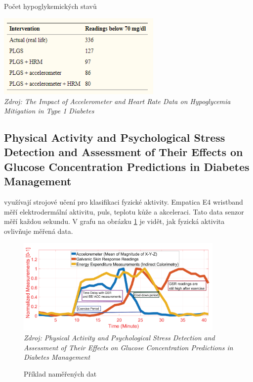\begin{table}[H]
\caption{Počet hypoglykemických stavů}
\label{tab:analyza:plgs}
\centering
\includegraphics[width=0.6\textwidth]{img/analyzaPA/plgs.png}\\
\textit{Zdroj: The Impact of Accelerometer and Heart Rate Data on Hypoglycemia Mitigation in Type 1 Diabetes \citep{analyzaPA.PLGS}}
\end{table}


\subsection{Physical Activity and Psychological Stress Detection and Assessment of Their Effects on Glucose Concentration Predictions in Diabetes Management}
\label{ch:analyza:SU}

\citet{analyzaPA.SU} využívají strojové učení pro klasifikaci fyzické aktivity. Empatica E4 wristband měří elektrodermální aktivitu, puls, teplotu kůže a akceleraci. Tato data senzor měří každou sekundu. V grafu na obrázku \ref{fig:analyza:su1} je vidět, jak fyzická aktivita ovlivňuje měřená data.

\begin{figure}[H]
\caption{Příklad naměřených dat}
\label{fig:analyza:su1}
\centering
\includegraphics[width=0.9\textwidth]{img/analyzaPA/su1.png}\\
\textit{Zdroj: Physical Activity and Psychological Stress Detection and Assessment of Their Effects on Glucose Concentration Predictions in Diabetes Management \citep{analyzaPA.SU}}
\end{figure}

